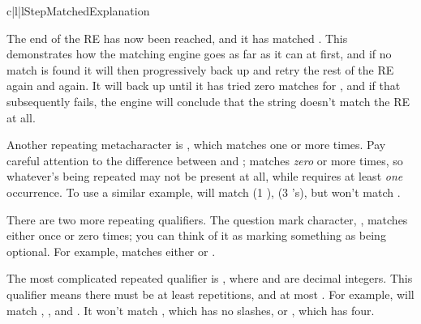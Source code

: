 \documentclass{howto}
\begin{document}
\begin{tableiii}{c|l|l}{}{Step}{Matched}{Explanation}
\end{tableiii}

The end of the RE has now been reached, and it has matched
.  This demonstrates how the matching engine goes as far as
it can at first, and if no match is found it will then progressively
back up and retry the rest of the RE again and again.  It will back up
until it has tried zero matches for \regexp{[bcd]*}, and if that
subsequently fails, the engine will conclude that the string doesn't
match the RE at all.

Another repeating metacharacter is \regexp{+}, which matches one or
more times.  Pay careful attention to the difference between
\regexp{*} and \regexp{+}; \regexp{*} matches \emph{zero} or more
times, so whatever's being repeated may not be present at all, while
\regexp{+} requires at least \emph{one} occurrence.  To use a similar
example,  will match  (1 ),
 (3 's), but won't match .

There are two more repeating qualifiers.  The question mark character,
, matches either once or zero times; you can think of it as
marking something as being optional.  For example, 
matches either  or .  

The most complicated repeated qualifier is
, where  and  are decimal
integers.  This qualifier means there must be at least 
repetitions, and at most .  For example, 
will match , , and .  It won't match
, which has no slashes, or , which has four.
\end{document}
